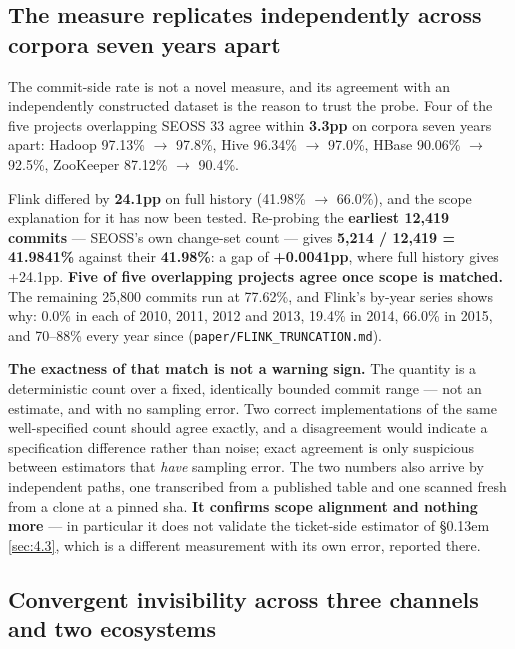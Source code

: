 \documentclass[11pt,a4paper]{article}
\begin{document}
\subsection{The measure replicates independently across corpora seven years apart}
\label{sec:4.4}

The commit-side rate is not a novel measure, and its agreement with an independently constructed dataset is the reason to trust the probe. Four of the five projects overlapping SEOSS 33 agree within \textbf{3.3pp} on corpora seven years apart: Hadoop 97.13\% $\rightarrow$ 97.8\%, Hive 96.34\% $\rightarrow$ 97.0\%, HBase 90.06\% $\rightarrow$ 92.5\%, ZooKeeper 87.12\% $\rightarrow$ 90.4\%.

Flink differed by \textbf{24.1pp} on full history (41.98\% $\rightarrow$ 66.0\%), and the scope explanation for it has now been tested. Re-probing the \textbf{earliest 12,419 commits} --- SEOSS's own change-set count --- gives \textbf{5,214 / 12,419 = 41.9841\%} against their \textbf{41.98\%}: a gap of \textbf{+0.0041pp}, where full history gives +24.1pp. \textbf{Five of five overlapping projects agree once scope is matched.} The remaining 25,800 commits run at 77.62\%, and Flink's by-year series shows why: 0.0\% in each of 2010, 2011, 2012 and 2013, 19.4\% in 2014, 66.0\% in 2015, and 70--88\% every year since (\texttt{paper/\allowbreak{}FLINK\_\allowbreak{}TRUNCATION.\allowbreak{}md}).

\textbf{The exactness of that match is not a warning sign.} The quantity is a deterministic count over a fixed, identically bounded commit range --- not an estimate, and with no sampling error. Two correct implementations of the same well-specified count should agree exactly, and a disagreement would indicate a specification difference rather than noise; exact agreement is only suspicious between estimators that \emph{have} sampling error. The two numbers also arrive by independent paths, one transcribed from a published table and one scanned fresh from a clone at a pinned sha. \textbf{It confirms scope alignment and nothing more} --- in particular it does not validate the ticket-side estimator of \S\kern0.13em \ref{sec:4.3}, which is a different measurement with its own error, reported there.

\subsection{Convergent invisibility across three channels and two ecosystems}
\label{sec:4.5}
\end{document}
